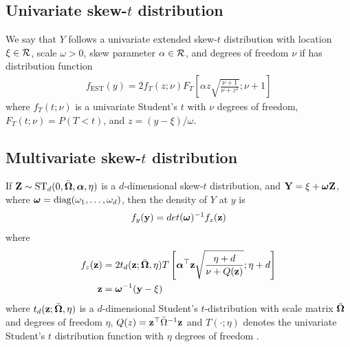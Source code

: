 \documentclass[useAMS,usenatbib,referee]{biomweb}
\begin{document}
\subsection*{Univariate skew-$t$ distribution}
We say that $Y$ follows a univariate extended skew-$t$ distribution with location $\xi \in \calR$, scale $\omega > 0$, skew parameter $\alpha \in \calR$, and degrees of freedom $\nu$ if has distribution function
\begin{align}
  f_{\text{EST}}(y) = 2 f_T (z; \nu) F_T\left[ \alpha z \sqrt{ \frac{ \nu + 1 }{ \nu + z^2}}; \nu + 1 \right]
\end{align}
where $f_T(t; \nu)$ is a univariate Student's $t$ with $\nu$ degrees of freedom, $F_T(t; \nu) = P(T < t)$, and \hbox{$z = (y - \xi) / \omega$}.

\subsection*{Multivariate skew-$t$ distribution}
If $\mbox{\bf Z} \sim \text{ST}_d(0, \bar{\mbox{\boldmath $\Omega$}}, \mbox{\boldmath $\alpha$}, \eta)$ is a $d$-dimensional skew-$t$ distribution, and $\mbox{\bf Y} = \xi + \mbox{\boldmath $\omega$} \mbox{\bf Z}$, where $\mbox{\boldmath $\omega$} = \text{diag}(\omega_1, \ldots, \omega_d)$, then the density of $Y$ at $y$ is
\begin{align}
  f_y(\mbox{\bf y}) = det(\mbox{\boldmath $\omega$})^{-1} f_z(\mbox{\bf z})
\end{align}
where
\begin{align}
  f_z(\mbox{\bf z}) &= 2 t_d(\mbox{\bf z}; \bar{\mbox{\boldmath $\Omega$}}, \eta) T \left[ \mbox{\boldmath $\alpha$}^\top \mbox{\bf z} \sqrt{ \frac{\eta + d}{\nu + Q(\mbox{\bf z})} }; \eta + d\right] \\
  \mbox{\bf z} &= \mbox{\boldmath $\omega$}^{-1}(\mbox{\bf y} - \xi)
\end{align}
where $t_d(\mbox{\bf z}; \bar{\mbox{\boldmath $\Omega$}}, \eta)$ is a $d$-dimensional Student's $t$-distribution with scale matrix $\bar{\mbox{\boldmath $\Omega$}}$ and degrees of freedom $\eta$, $Q(z) = \mbox{\bf z}^\top \bar{\Omega}^{-1}\mbox{\bf z}$ and $T(\cdot; \eta)$ denotes the univariate Student's $t$ distribution function with $\eta$ degrees of freedom \citep{Azzalini2014}.
\end{document}
